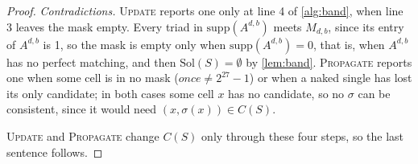 \documentclass[11pt]{article}
\theoremstyle{definition}
\theoremstyle{plain}
\let\origtextsc\textsc
\renewcommand{\textsc}[1]{\textup{\origtextsc{#1}}}
\begin{document}
\begin{proof}
\emph{Contradictions.} \textsc{Update} reports one only at line 4 of \cref{alg:band}, when line 3 leaves the mask
empty. Every triad in $\mathrm{supp}(A^{d,b})$ meets $M_{d,b}$, since its entry of $A^{d,b}$ is 1, so the mask is
empty only when $\mathrm{supp}(A^{d,b})=0$, that is, when $A^{d,b}$ has no perfect matching, and then
$\mathrm{Sol}(S)=\emptyset$ by \cref{lem:band}. \textsc{Propagate} reports one when some cell is in no mask
($\mathit{once}\neq 2^{27}-1$) or when a naked single has lost its only candidate; in both cases some cell $x$ has no
candidate, so no $\sigma$ can be consistent, since it would need $(x,\sigma(x))\in C(S)$.

\textsc{Update} and \textsc{Propagate} change $C(S)$ only through these four steps, so the last sentence follows.
\end{proof}
\end{document}
